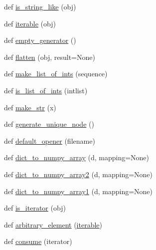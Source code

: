 \begin{DoxyCompactItemize}
\item 
def \hyperlink{namespacenetworkx_1_1utils_1_1misc_a616b747e99687676813d854ac515795c}{is\+\_\+string\+\_\+like} (obj)
\item 
def \hyperlink{namespacenetworkx_1_1utils_1_1misc_ae65f2c291dc1744406702c19798e65ec}{iterable} (obj)
\item 
def \hyperlink{namespacenetworkx_1_1utils_1_1misc_a90b806d70b489812901734395285c2bc}{empty\+\_\+generator} ()
\item 
def \hyperlink{namespacenetworkx_1_1utils_1_1misc_ab942ca72fb7de65e013cab73285c339d}{flatten} (obj, result=None)
\item 
def \hyperlink{namespacenetworkx_1_1utils_1_1misc_a18436e33d258df06eeba2a18d9e543c6}{make\+\_\+list\+\_\+of\+\_\+ints} (sequence)
\item 
def \hyperlink{namespacenetworkx_1_1utils_1_1misc_af90ea0c0084848c48f7bd856353598f4}{is\+\_\+list\+\_\+of\+\_\+ints} (intlist)
\item 
def \hyperlink{namespacenetworkx_1_1utils_1_1misc_a4b8c7a6a6815b9b4c620f5942fafc93f}{make\+\_\+str} (x)
\item 
def \hyperlink{namespacenetworkx_1_1utils_1_1misc_a3e735b0f0572a68c92123b6b2f842d1d}{generate\+\_\+unique\+\_\+node} ()
\item 
def \hyperlink{namespacenetworkx_1_1utils_1_1misc_af45a2218b16258dca06f5b68712fb7f3}{default\+\_\+opener} (filename)
\item 
def \hyperlink{namespacenetworkx_1_1utils_1_1misc_af6556592b73c85d84580e76bc08ea7af}{dict\+\_\+to\+\_\+numpy\+\_\+array} (d, mapping=None)
\item 
def \hyperlink{namespacenetworkx_1_1utils_1_1misc_ac681cf0a0a690ee93b36e90214e2e082}{dict\+\_\+to\+\_\+numpy\+\_\+array2} (d, mapping=None)
\item 
def \hyperlink{namespacenetworkx_1_1utils_1_1misc_a60cdb087fa42789016076eff206215c2}{dict\+\_\+to\+\_\+numpy\+\_\+array1} (d, mapping=None)
\item 
def \hyperlink{namespacenetworkx_1_1utils_1_1misc_ab3ea50d1f182fcd85380d859726024e5}{is\+\_\+iterator} (obj)
\item 
def \hyperlink{namespacenetworkx_1_1utils_1_1misc_aee73dcbb065355b5943f7f81cbda859b}{arbitrary\+\_\+element} (\hyperlink{namespacenetworkx_1_1utils_1_1misc_ae65f2c291dc1744406702c19798e65ec}{iterable})
\item 
def \hyperlink{namespacenetworkx_1_1utils_1_1misc_a929828e4156160839e8a2f8fb636a0c6}{consume} (iterator)

\end{DoxyCompactItemize}
